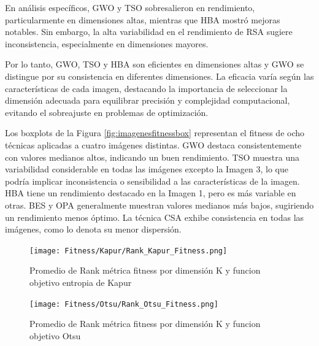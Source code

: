 \documentclass[conference]{IEEEtran}
\begin{document}
\noindent En análisis específicos, GWO y TSO sobresalieron en rendimiento, particularmente en dimensiones altas, mientras que HBA mostró mejoras notables. Sin embargo, la alta variabilidad en el rendimiento de RSA sugiere inconsistencia, especialmente en dimensiones mayores.

\noindent Por lo tanto, GWO, TSO y HBA son eficientes en dimensiones altas y GWO se distingue por su consistencia en diferentes dimensiones. La eficacia varía según las características de cada imagen, destacando la importancia de seleccionar la dimensión adecuada para equilibrar precisión y complejidad computacional, evitando el sobreajuste en problemas de optimización.


\noindent Los boxplots  de la Figura \ref{fig:imagenesfitnessbox} representan el fitness de ocho técnicas aplicadas a cuatro imágenes distintas. GWO destaca consistentemente con valores medianos altos, indicando un buen rendimiento. TSO muestra una variabilidad considerable en todas las imágenes excepto la Imagen 3, lo que podría implicar inconsistencia o sensibilidad a las características de la imagen. HBA tiene un rendimiento destacado en la Imagen 1, pero es más variable en otras. BES y OPA generalmente muestran valores medianos más bajos, sugiriendo un rendimiento menos óptimo. La técnica CSA exhibe consistencia en todas las imágenes, como lo denota su menor dispersión.

\begin{figure}[!htb]
	\centering
	\texttt{[image: Fitness/Kapur/Rank\_Kapur\_Fitness.png]}
	\caption{Promedio de Rank métrica fitness por dimensión K y funcion objetivo entropia de Kapur}
	\label{fig:fig510}
\end{figure}
\begin{figure}[!htb]
	\centering
	\texttt{[image: Fitness/Otsu/Rank\_Otsu\_Fitness.png]}
	\caption{Promedio de Rank métrica fitness por dimensión K y funcion objetivo Otsu}
	\label{fig:fig510}
\end{figure}
\end{document}
